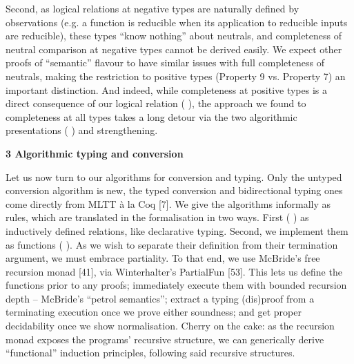 \documentclass[10pt,a4paper]{amsart}
\begin{document}
 
 
Second, as logical relations at negative types are naturally defined by observations (e.g. a function is reducible when its application to reducible inputs are reducible), these types “know nothing” about neutrals, and completeness of neutral comparison at negative types cannot be derived easily. We expect other proofs of “semantic” flavour to have similar issues with full completeness of neutrals, making the restriction to positive types (Property 9 vs. Property 7) an important distinction. And indeed, while completeness at positive types is a direct consequence of our logical relation ( ), the approach we found to completeness at all types takes a long detour via the two algorithmic presentations ( ) and strengthening.\par
 
 
 
 


 
\par\medskip\noindent\textbf{3 Algorithmic typing and conversion}\par
 
 
Let us now turn to our algorithms for conversion and typing. Only the untyped conversion algorithm is new, the typed conversion and bidirectional typing ones come directly from MLTT à la Coq [7]. We give the algorithms informally as rules, which are translated in the formalisation in two ways. First ( ) as inductively defined relations, like declarative typing. Second, we implement them as functions ( ). As we wish to separate their definition from their termination argument, we must embrace partiality. To that end, we use McBride’s free recursion monad [41], via Winterhalter’s PartialFun [53]. This lets us define the functions prior to any proofs; immediately execute them with bounded recursion depth – McBride’s “petrol semantics”; extract a typing (dis)proof from a terminating execution once we prove either soundness; and get proper decidability once we show normalisation. Cherry on the cake: as the recursion monad exposes the programs’ recursive structure, we can generically derive “functional” induction principles, following said recursive structures.\par
 
\end{document}

